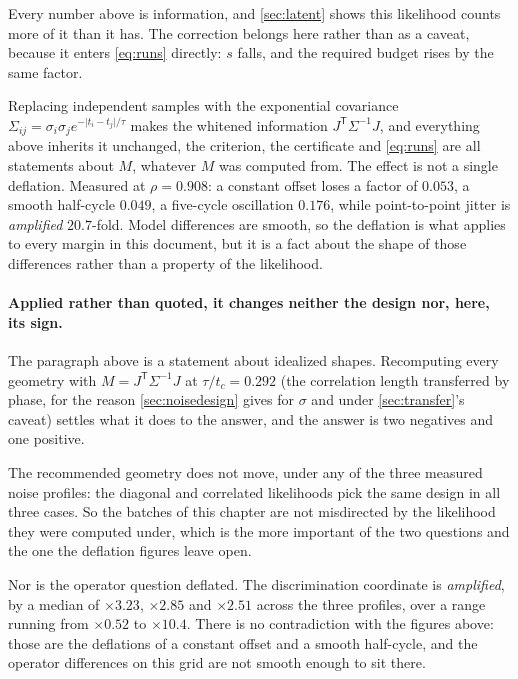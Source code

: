 \documentclass[10pt]{article}
\begin{document}
Every number above is information, and \cref{sec:latent} shows this likelihood counts more of it
than it has. The correction belongs here rather than as a caveat, because it enters
\eqref{eq:runs} directly: $s$ falls, and the required budget rises by the same factor.

Replacing independent samples with the exponential covariance
$\Sigma_{ij} = \sigma_i\sigma_j e^{-\lvert t_i-t_j\rvert/\tau}$ makes the whitened information
$J^{\mathsf T}\Sigma^{-1}J$, and everything above inherits it unchanged, the criterion, the
certificate and \eqref{eq:runs} are all statements about $M$, whatever $M$ was computed from.
The effect is not a single deflation. Measured at $\rho = 0.908$: a constant offset loses a
factor of $0.053$, a smooth half-cycle $0.049$, a five-cycle oscillation $0.176$, while
point-to-point jitter is \emph{amplified} $20.7$-fold. Model differences are smooth, so the
deflation is what applies to every margin in this document, but it is a fact about the shape of
those differences rather than a property of the likelihood.

\paragraph{Applied rather than quoted, it changes neither the design nor, here, its sign.}
The paragraph above is a statement about idealized shapes. Recomputing every geometry with
$M = J^{\mathsf T}\Sigma^{-1}J$ at $\tau/t_c = 0.292$ (the correlation length transferred by
phase, for the reason \cref{sec:noisedesign} gives for $\sigma$ and under
\cref{sec:transfer}'s caveat) settles what it does to the
answer, and the answer is two negatives and one positive.

The recommended geometry does not move, under any of the three measured noise profiles: the
diagonal and correlated likelihoods pick the same design in all three cases. So the batches of
this chapter are not misdirected by the likelihood they were computed under, which is the more
important of the two questions and the one the deflation figures leave open.

Nor is the operator question deflated. The discrimination coordinate is \emph{amplified}, by a
median of $\times 3.23$, $\times 2.85$ and $\times 2.51$ across the three profiles, over a range
running from $\times 0.52$ to $\times 10.4$. There is no contradiction with the figures above:
those are the deflations of a constant offset and a smooth half-cycle, and the operator
differences on this grid are not smooth enough to sit there.
\end{document}
